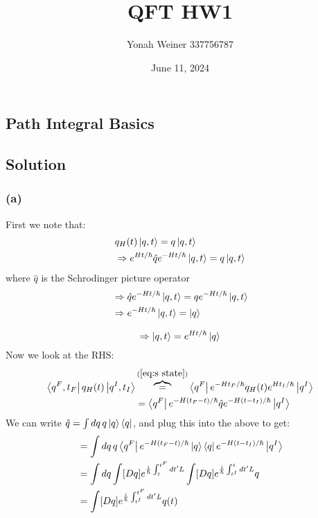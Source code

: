 \documentclass{article}
\title{QFT HW1}
\author{Yonah Weiner 337756787}
\date{June 11, 2024}
\begin{document}
\maketitle
\subsection*{Path Integral Basics}
\subsection*{Solution}
\subsubsection*{(a)}
First we note that:\\
\begin{align*}
      & q_H(t)\ket{q,t}=q\ket{q,t} \\
      & \Rightarrow e^{Ht/\hbar}\hat qe^{-Ht/\hbar}\ket{q,t}=q\ket{q,t}
      \end{align*}
       where $\hat q$ is the Schrodinger picture operator
      \begin{align*}
      & \Rightarrow \hat qe^{-Ht/\hbar}\ket{q,t}=qe^{-Ht/\hbar}\ket{q,t}\\
      & \Rightarrow e^{-Ht/\hbar}\ket{q,t}=\ket{q}
\end{align*}


\begin{equation} \label{eq:s state}
    \Rightarrow \ket{q,t}=e^{Ht/\hbar}\ket{q}
\end{equation}
\noindent
Now we look at the RHS:
\begin{equation*}
    \begin{split}
        \bra{q^F,t_F}q_H(t)\ket{q^I,t_I} & \overbrace{=}^{(\ref{eq:s state})} \bra{q^F}e^{-Ht_F/\hbar}q_H(t)e^{Ht_I/\hbar}\ket{q^I}\\
        &=\bra{q^F}e^{-H(t_F-t)/\hbar}\hat qe^{-H(t - t_I)/\hbar}\ket{q^I}
    \end{split}
\end{equation*}
We can write $\hat q = \int dq\, q \ket{q}\bra{q}$, and plug this into the above to get:
\begin{equation*}
    \begin{split}
        & =\int dq\, q \bra{q^F}e^{-H(t_F-t)/\hbar}\ket{q}\bra{q}e^{-H(t - t_I)/\hbar}\ket{q^I}\\
        & =\int dq \int [Dq] e^{\frac{i}{\hbar}\int_{t}^{t^F}dt'L}\int [Dq] e^{\frac{i}{\hbar}\int_{t^I}^{t}dt'L}q\\
        & =\int [Dq] e^{\frac{i}{\hbar}\int_{t^I}^{t^F}dt'L}q(t)
    \end{split}
\end{equation*}
\end{document}
